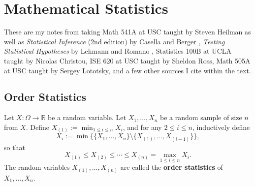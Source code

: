 %
%
%
%
%
%
%
%
%
%
%
%
%

\chapter{Mathematical Statistics}

These are my notes from taking Math 541A at USC taught by Steven Heilman as well as \textit{Statistical Inference} (2nd edition) by Casella and Berger \citep{CaseBerg:01}, \textit{Testing Statistical Hypotheses} by Lehmann and Romano \citep{lehmann2005testing}, Statistics 100B at UCLA taught by Nicolas Christou, ISE 620 at USC taught by Sheldon Ross, Math 505A at USC taught by Sergey Lototsky, and a few other sources I cite within the text.

\section{Order Statistics}

\begin{definition} Let \(X:\Omega\to\mathbb{R}\) be a random variable.  Let $X_{1},\ldots,X_{n}$ be a random sample of size $n$ from $X$.  Define $X_{(1)}:=\min_{1\leq i\leq n}X_{i}$, and for any $2\leq i\leq n$, inductively define
$$X_{i}:=\min\Big\{\{X_{1},\ldots,X_{n}\}\setminus\{X_{(1)},\ldots,X_{(i-1)}\}\Big\},$$
so that
$$X_{(1)}\leq X_{(2)}\leq\cdots\leq X_{(n)}=\max_{1\leq i\leq n}X_{i}.$$
The random variables $X_{(1)},\ldots,X_{(n)}$ are called the \textbf{order statistics} of $X_{1},\ldots,X_{n}$.


\end{definition}

